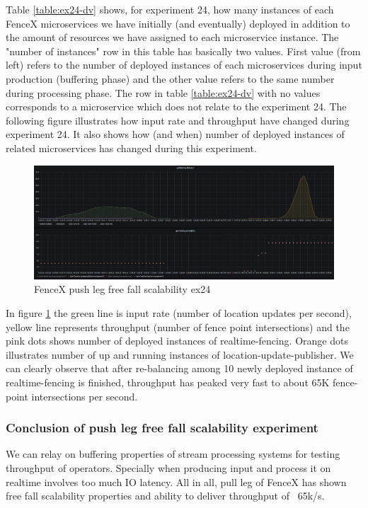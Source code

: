 \documentclass[a4]{report}
\begin{document}
    Table \ref{table:ex24-dv} shows, for experiment 24, how many instances of each FenceX microservices we have
    initially (and eventually) deployed in addition to the amount of resources we have assigned to each microservice
    instance.
    The "number of instances" row in this table has basically two values.
    First value (from left) refers to the number of deployed instances of each microservices during input production
    (buffering phase) and the other value refers to the same number during processing phase.
    The row in table \ref{table:ex24-dv} with no values corresponds to a microservice which does not relate to the
    experiment 24.
    The following figure illustrates how input rate and throughput have changed during experiment 24.
    It also shows how (and when) number of deployed instances of related microservices has changed during this
    experiment.

    \clearpage

    \begin{figure}[h!]
        \centering
        \caption{FenceX push leg free fall scalability ex24}
        \label{fig:ex24}
        \includegraphics[width=\linewidth, scale=2]{images/evaluation/ex24-benchmarking-ongoing-1per2sec.png}
    \end{figure}

    In figure \ref{fig:ex24} the green line is input rate (number of location updates per second),
    yellow line represents throughput (number of fence point intersections) and the pink dots shows number of
    deployed instances of realtime-fencing.
    Orange dots illustrates number of up and running instances of location-update-publisher.
    We can clearly observe that after re-balancing among 10 newly deployed instance of realtime-fencing is finished,
    throughput has peaked very fast to about 65K fence-point intersections per second.

    \subsubsection{Conclusion of push leg free fall scalability experiment}
    We can relay on buffering properties of stream processing systems for testing throughput of operators.
    Specially when producing input and process it on realtime involves too much IO latency.
    All in all, pull leg of FenceX has shown free fall scalability properties and ability to deliver throughput of
    ~65k/s.
\end{document}
